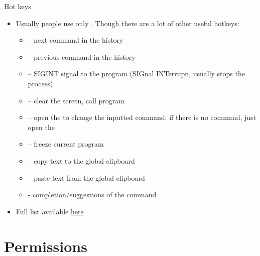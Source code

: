 \documentclass[usenames,dvipsnames,10pt,aspectratio=169]{beamer}
\begin{document}
\begin{frame}{Hot keys}
    \begin{itemize}
        \item Usually people use only , Though there are a lot of other useful hotkeys:
            \begin{itemize}
                \item {} -- next command in the history
                \item {} -- previous command in the history
                \item {} -- SIGINT signal to the program (SIGnal INTerrupn, usually stops the process)
                \item {} -- clear the screen, call  program
                \item {} -- open the  to change the inputted command; if there is no command, just open the 
                \item {} -- freeze current program
                \item {} -- copy text to the global clipboard
                \item {} -- paste text from the global clipboard
                \item {} - completion/suggestions of the command
            \end{itemize}
        \item Full list available \href{https://telegra.ph/BashGoryachie-klavishi-09-17}{here}
    \end{itemize}
\end{frame}


\section{Permissions}

\end{document}
